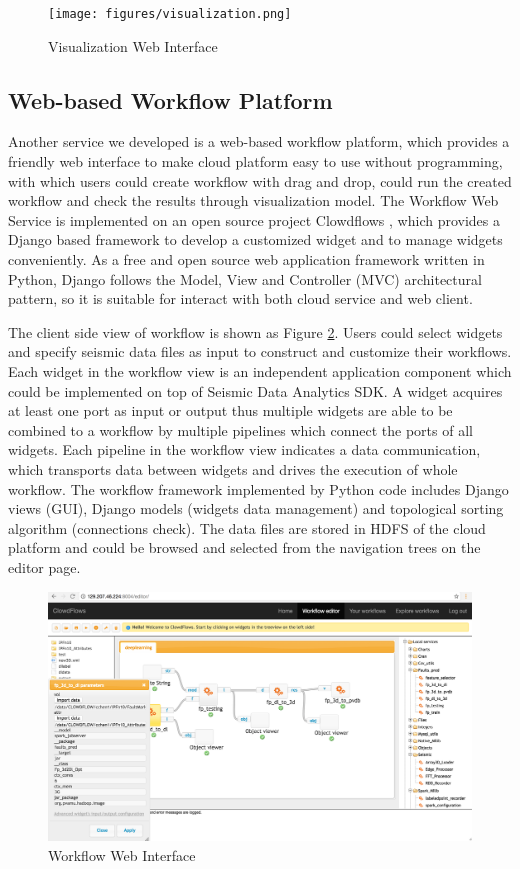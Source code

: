 \begin{figure}[h]
\centering
\texttt{[image: figures/visualization.png]}
\caption{Visualization Web Interface}
\label{visualization}
\end{figure}


\subsection{Web-based Workflow Platform}

Another service we developed is a web-based workflow platform, which provides a friendly web interface to make cloud platform easy to use without programming, with which users could create workflow with drag and drop, could run the created workflow and check the results through visualization model. The Workflow Web Service is implemented on an open source project Clowdflows \cite{Clowdflows}, which provides a Django based framework to develop a customized widget and to manage widgets conveniently. As a free and open source web application framework written in Python, Django follows the Model, View and Controller (MVC) architectural pattern, so it is suitable for interact with both cloud service and web client.

The client side view of workflow is shown as Figure \ref{workflow}. Users could select widgets and specify seismic data files as input to construct and customize their workflows. Each widget in the workflow view is an independent application component which could be implemented on top of Seismic Data Analytics SDK. A widget acquires at least one port as input or output thus multiple widgets are able to be combined to a workflow by multiple pipelines which connect the ports of all widgets. Each pipeline in the workflow view indicates a data communication, which transports data between widgets and drives the execution of whole workflow. The workflow framework implemented by Python code includes Django views (GUI), Django models (widgets data management) and topological sorting algorithm (connections check).  The data files are stored in HDFS of the cloud platform and could be browsed and selected from the navigation trees on the editor page.

\begin{figure}[h]
\centering
\includegraphics[scale=0.3]{figures/workflow.png}
\caption{Workflow Web Interface}
\label{workflow}
\end{figure}

